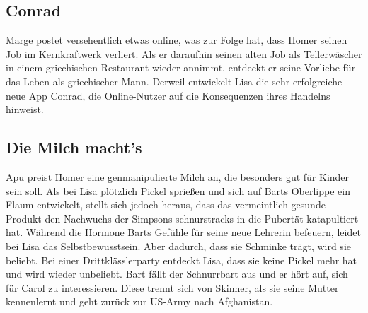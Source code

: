 
\subsection{Conrad}\label{VABF03}
Marge postet versehentlich etwas online, was zur Folge hat, dass Homer seinen Job im Kernkraftwerk verliert. Als er daraufhin seinen alten Job als Tellerwäscher in einem griechischen Restaurant wieder annimmt, entdeckt er seine Vorliebe für das Leben als griechischer Mann. Derweil entwickelt Lisa die sehr erfolgreiche neue App Conrad, die Online-Nutzer auf die Konsequenzen ihres Handelns hinweist.


\subsection{Die Milch macht's}
Apu preist Homer eine genmanipulierte Milch an, die besonders gut für Kinder sein soll. Als bei Lisa plötzlich Pickel sprießen und sich auf Barts Oberlippe ein Flaum entwickelt, stellt sich jedoch heraus, dass das vermeintlich gesunde Produkt den Nachwuchs der Simpsons schnurstracks in die Pubertät katapultiert hat. Während die Hormone Barts Gefühle für seine neue Lehrerin befeuern, leidet bei Lisa das Selbstbewusstsein. Aber dadurch, dass sie Schminke trägt, wird sie beliebt. Bei einer Drittklässlerparty entdeckt Lisa, dass sie keine Pickel mehr hat und wird wieder unbeliebt. Bart fällt der Schnurrbart aus und er hört auf, sich für Carol zu interessieren. Diese trennt sich von Skinner, als sie seine Mutter kennenlernt und geht zurück zur US-Army nach Afghanistan.

